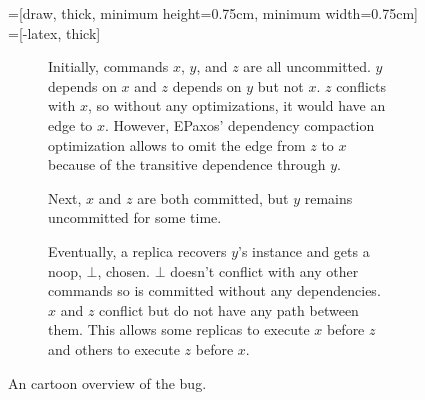 \documentclass{mwhittaker}
\begin{document}
\begin{figure}[h]
  \centering

  =[draw, thick, minimum height=0.75cm, minimum width=0.75cm]
  =[-latex, thick]

  \begin{subfigure}[t]{0.3\textwidth}
    \centering
    \caption{%
      Initially, commands $x$, $y$, and $z$ are all uncommitted. $y$ depends on
      $x$ and $z$ depends on $y$ but not $x$. $z$ conflicts with $x$, so
      without any optimizations, it would have an edge to $x$. However, EPaxos'
      dependency compaction optimization allows to omit the edge from $z$ to
      $x$ because of the transitive dependence through $y$.
    }
  \end{subfigure}%
  \hspace{0.5cm}%
  \begin{subfigure}[t]{0.3\textwidth}
    \centering
    \caption{%
      Next, $x$ and $z$ are both committed, but $y$ remains uncommitted for
      some time.
    }
  \end{subfigure}%
  \hspace{0.5cm}%
  \begin{subfigure}[t]{0.3\textwidth}
    \centering
    \caption{%
      Eventually, a replica recovers $y$'s instance and gets a noop, $\bot$,
      chosen. $\bot$ doesn't conflict with any other commands so is committed
      without any dependencies. $x$ and $z$ conflict but do not have any path
      between them. This allows some replicas to execute $x$ before $z$ and
      others to execute $z$ before $x$.
    }
  \end{subfigure}

  \caption{An cartoon overview of the bug.}
\end{figure}
\end{document}
